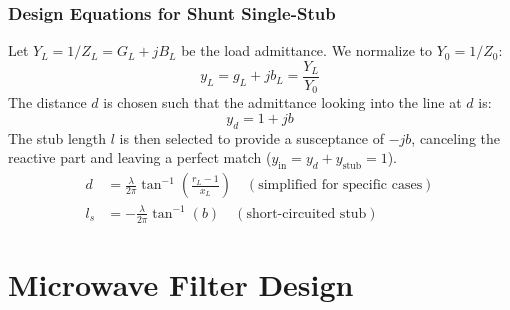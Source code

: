 \documentclass[12pt,a4paper]{article}
\begin{document}
\begin{tcolorbox}[tikzbox, title={Shunt Single-Stub Matching Network}]
\centering
{}
\end{tcolorbox}

\subsubsection{Design Equations for Shunt Single-Stub}
Let $Y_L = 1/Z_L = G_L + j B_L$ be the load admittance. We normalize to $Y_0 = 1/Z_0$:
\begin{equation}
  y_L = g_L + j b_L = \frac{Y_L}{Y_0}
\end{equation}
The distance $d$ is chosen such that the admittance looking into the line at $d$ is:
\begin{equation}
  y_d = 1 + j b
\end{equation}
The stub length $l$ is then selected to provide a susceptance of $-j b$, canceling the reactive part and leaving a perfect match ($y_{\text{in}} = y_d + y_{\text{stub}} = 1$).
\begin{align}
  d &= \frac{\lambda}{2\pi} \tan^{-1}\left( \frac{r_L - 1}{x_L} \right) \quad (\text{simplified for specific cases}) \\
  l_s &= -\frac{\lambda}{2\pi} \tan^{-1}(b) \quad (\text{short-circuited stub})
\end{align}

\section{Microwave Filter Design}
\end{document}
